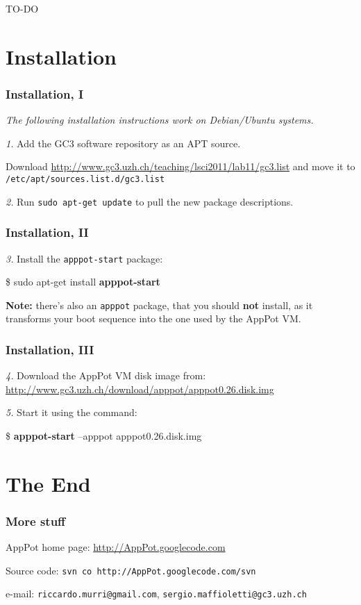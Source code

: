 \documentclass[english,serif,mathserif,xcolor=pdftex,dvipsnames,table]{beamer}
\newcommand{\+}{\largeskip}
\begin{document}
\begin{frame}
  {\Huge TO-DO}
\end{frame}


\section{Installation}

\begin{frame}
  \frametitle{Installation, I}
  {\em The following installation instructions work on Debian/Ubuntu systems.}

  \emph{1.} Add the GC3 software repository as an APT source.
  
  \+ Download
  {\small\url{http://www.gc3.uzh.ch/teaching/lsci2011/lab11/gc3.list}} and
  move it to \texttt{/etc/apt/sources.list.d/gc3.list}

  \+
  \emph{2.} Run \texttt{sudo apt-get update} to pull the new package
  descriptions. 
\end{frame}

\begin{frame}[fragile]
  \frametitle{Installation, II}
  \emph{3.} Install the \texttt{apppot-start} package:
\begin{semiverbatim}
\$ {sudo apt-get install} \textbf{apppot-start}
\end{semiverbatim}

  \+
  \textbf{Note:} there's also an \texttt{apppot} package, that you
  should \textbf{not} install, as it transforms your boot sequence into
  the one used by the AppPot VM.
\end{frame}

\begin{frame}[fragile]
  \frametitle{Installation, III}
  \emph{4.} Download the AppPot VM disk image from:
  {\small\url{http://www.gc3.uzh.ch/download/apppot/apppot0.26.disk.img}}

  \+
  \emph{5.} Start it using the command:
\begin{semiverbatim}
\$ \textbf{apppot-start} --apppot apppot0.26.disk.img
\end{semiverbatim}
\end{frame}


\section{The End}

\begin{frame}
  \frametitle{More stuff}
  \begin{center}
    AppPot home page: \href{http://AppPot.googlecode.com}{http://AppPot.googlecode.com}

    \+
    Source code: \texttt{svn co http://AppPot.googlecode.com/svn}
    
    \+
    e-mail: \texttt{riccardo.murri@gmail.com}, \texttt{sergio.maffioletti@gc3.uzh.ch}
  \end{center}
\end{frame}
\end{document}
